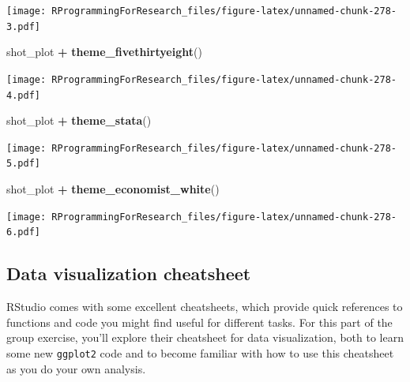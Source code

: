 \documentclass[]{book}
\makeatletter
\newenvironment{Shaded}{\begin{snugshade}}{\end{snugshade}}
\newcommand{\KeywordTok}[1]{\textcolor[rgb]{0.13,0.29,0.53}{\textbf{#1}}}
\newcommand{\StringTok}[1]{\textcolor[rgb]{0.31,0.60,0.02}{#1}}
\newcommand{\OperatorTok}[1]{\textcolor[rgb]{0.81,0.36,0.00}{\textbf{#1}}}
\newcommand{\NormalTok}[1]{#1}
\newenvironment{kframe}{%
\medskip{}
\setlength{\fboxsep}{.8em}
 \def\at@end@of@kframe{}%
 \ifinner\ifhmode%
  \def\at@end@of@kframe{\end{minipage}}%
  \begin{minipage}{\columnwidth}%
 \fi\fi%
 \def\FrameCommand##1{\hskip\@totalleftmargin \hskip-\fboxsep
 \colorbox{shadecolor}{##1}\hskip-\fboxsep
     \hskip-\linewidth \hskip-\@totalleftmargin \hskip\columnwidth}%
 \MakeFramed {\advance\hsize-\width
   \@totalleftmargin\z@ \linewidth\hsize
   \@setminipage}}%
 {\par\unskip\endMakeFramed%
 \at@end@of@kframe}
\renewenvironment{Shaded}{\begin{kframe}}{\end{kframe}}
\theoremstyle{definition}
\theoremstyle{definition}
\theoremstyle{definition}
\theoremstyle{remark}
\makeatother
\begin{document}
\texttt{[image: RProgrammingForResearch\_files/figure-latex/unnamed-chunk-278-3.pdf]}

\begin{Shaded}
\begin{Highlighting}[]
\NormalTok{shot_plot }\OperatorTok{+}\StringTok{ }\KeywordTok{theme_fivethirtyeight}\NormalTok{()}
\end{Highlighting}
\end{Shaded}

\texttt{[image: RProgrammingForResearch\_files/figure-latex/unnamed-chunk-278-4.pdf]}

\begin{Shaded}
\begin{Highlighting}[]
\NormalTok{shot_plot }\OperatorTok{+}\StringTok{ }\KeywordTok{theme_stata}\NormalTok{()}
\end{Highlighting}
\end{Shaded}

\texttt{[image: RProgrammingForResearch\_files/figure-latex/unnamed-chunk-278-5.pdf]}

\begin{Shaded}
\begin{Highlighting}[]
\NormalTok{shot_plot }\OperatorTok{+}\StringTok{ }\KeywordTok{theme_economist_white}\NormalTok{()}
\end{Highlighting}
\end{Shaded}

\texttt{[image: RProgrammingForResearch\_files/figure-latex/unnamed-chunk-278-6.pdf]}

\subsection{Data visualization
cheatsheet}\label{data-visualization-cheatsheet}

RStudio comes with some excellent cheatsheets, which provide quick
references to functions and code you might find useful for different
tasks. For this part of the group exercise, you'll explore their
cheatsheet for data visualization, both to learn some new
\texttt{ggplot2} code and to become familiar with how to use this
cheatsheet as you do your own analysis.
\end{document}
